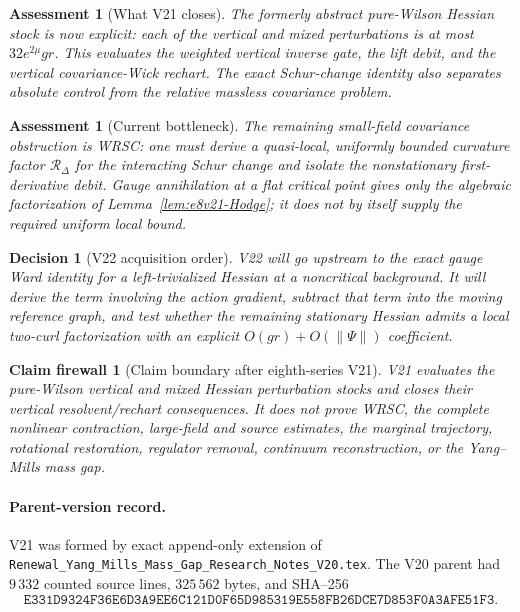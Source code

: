 \documentclass[11pt,oneside]{book}
\newtheorem{assessment}[theorem]{Assessment}
\newtheorem{firewall}[theorem]{Claim firewall}
\newtheorem{decision}[theorem]{Decision}
\theoremstyle{definition}
\theoremstyle{remark}
\begin{document}
\begin{assessment}[What V21 closes]
\label{ass:e8v21-closes}
The formerly abstract pure-Wilson Hessian stock is now explicit:
each of the vertical and mixed perturbations is at most
\(32e^{2\mu}gr\).  This evaluates the weighted vertical inverse gate,
the lift debit, and the vertical covariance-Wick rechart.  The exact
Schur-change identity also separates absolute control from the
relative massless covariance problem.
\end{assessment}

\begin{assessment}[Current bottleneck]
\label{ass:e8v21-remains}
The remaining small-field covariance obstruction is WRSC: one must
derive a quasi-local, uniformly bounded curvature factor
\(\mathcal R_\Delta\) for the interacting Schur change and isolate the
nonstationary first-derivative debit.  Gauge annihilation at a flat
critical point gives only the algebraic factorization of
Lemma~\ref{lem:e8v21-Hodge}; it does not by itself supply the required
uniform local bound.
\end{assessment}

\begin{decision}[V22 acquisition order]
\label{dec:e8v21-v22}
V22 will go upstream to the exact gauge Ward identity for a
left-trivialized Hessian at a noncritical background.  It will derive
the term involving the action gradient, subtract that term into the
moving reference graph, and test whether the remaining stationary
Hessian admits a local two-curl factorization with an explicit
\(O(gr)+O(\|\Psi\|)\) coefficient.
\end{decision}

\begin{firewall}[Claim boundary after eighth-series V21]
\label{fire:e8v21-claim}
V21 evaluates the pure-Wilson vertical and mixed Hessian perturbation
stocks and closes their vertical resolvent/rechart consequences.  It
does not prove WRSC, the complete nonlinear contraction, large-field
and source estimates, the marginal trajectory, rotational
restoration, regulator removal, continuum reconstruction, or the
Yang--Mills mass gap.
\end{firewall}

\paragraph{Parent-version record.}
V21 was formed by exact append-only extension of
\texttt{Renewal\_Yang\_Mills\_Mass\_Gap\_Research\_Notes\_V20.tex}.
The V20 parent had \(9\,332\) counted source lines,
\(325\,562\) bytes, and SHA--256
\[
\texttt{E331D9324F36E6D3A9EE6C121D0F65D985319E558FB26DCE7D853F0A3AFE51F3}.
\]
\end{document}
